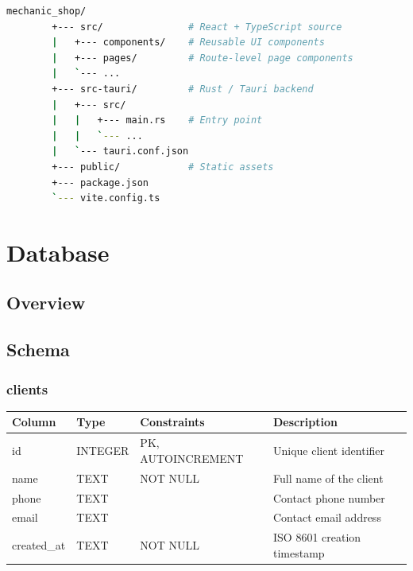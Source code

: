 \documentclass[12pt, a4paper]{report}
\begin{document}
	\begin{lstlisting}[language=bash, caption={Repository structure}]
		mechanic_shop/
		+--- src/               # React + TypeScript source
		|   +--- components/    # Reusable UI components
		|   +--- pages/         # Route-level page components
		|   `--- ...
		+--- src-tauri/         # Rust / Tauri backend
		|   +--- src/
		|   |   +--- main.rs    # Entry point
		|   |   `--- ...
		|   `--- tauri.conf.json
		+--- public/            # Static assets
		+--- package.json
		`--- vite.config.ts
	\end{lstlisting}
	
	\chapter{Database}
	
	\section{Overview}
	
	\section{Schema}
	
	\subsection{clients}
	
	\begin{tabularx}{\textwidth}{l l l X}
		\toprule
		\textbf{Column} & \textbf{Type} & \textbf{Constraints} & \textbf{Description} \\
		\midrule
		id         & INTEGER & PK, AUTOINCREMENT & Unique client identifier \\
		name       & TEXT    & NOT NULL          & Full name of the client \\
		phone      & TEXT    &                   & Contact phone number \\
		email      & TEXT    &                   & Contact email address \\
		created\_at & TEXT   & NOT NULL          & ISO 8601 creation timestamp \\
		\bottomrule
	\end{tabularx}
	
\end{document}
